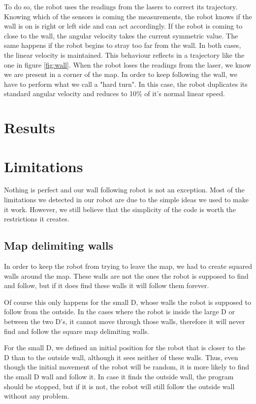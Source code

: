 \documentclass[10pt,journal,compsoc]{IEEEtran}
\begin{document}
To do so, the robot uses the readings from the lasers to correct its trajectory. Knowing which of the sensors is coming the measurements, the robot knows if the wall is on is right or left side and can act accordingly. If the robot is coming to close to the wall, the angular velocity takes the current symmetric value. The same happens if the robot begins to stray too far from the wall. In both cases, the linear velocity is maintained. This behaviour reflects in a trajectory like the one in figure \ref{fig:wall}. When the robot loses the readings from the laser, we know we are present in a corner of the map. In order to keep following the wall, we have to perform what we call a "hard turn". In this case, the robot duplicates its standard angular velocity and reduces to 10\% of it's normal linear speed.

\section{Results}

\section{Limitations}

Nothing is perfect and our wall following robot is not an exception. Most of the limitations we detected in our robot are due to the simple ideas we used to make it work. However, we still believe that the simplicity of the code is worth the restrictions it creates.

\subsection{Map delimiting walls}

In order to keep the robot from trying to leave the map, we had to create squared walls around the map. These walls are not the ones the robot is supposed to find and follow, but if it does find these walls it will follow them forever.

Of course this only happens for the small D, whose walls the robot is supposed to follow from the outside. In the cases where the robot is inside the large D or between the two D's, it cannot move through those walls, therefore it will never find and follow the square map delimiting walls.

For the small D, we defined an initial position for the robot that is closer to the D than to the outside wall, although it sees neither of these walls. Thus, even though the initial movement of the robot will be random, it is more likely to find the small D wall and follow it. In case it finds the outside wall, the program should be stopped, but if it is not, the robot will still follow the outside wall without any problem.
\end{document}

